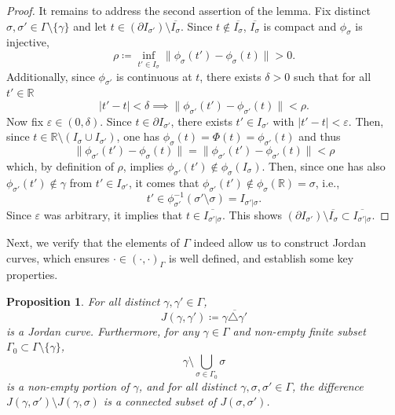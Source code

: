 \documentclass[a4paper, 11pt]{article} %
\theoremstyle{plain}
\newtheorem{proposition}[theorem]{Proposition}
\newcommand{\R}{\mathbb{R}}
\newcommand{\1}{\mathds 1}
\numberwithin{equation}{section}
\begin{document}
\begin{proof}
    It remains to address the second assertion of the lemma. Fix distinct $\sigma,\sigma'\in\Gamma\setminus\{\gamma\}$ and let $t\in(\partial I_{\sigma'})\setminus\overline{I_{\sigma}}$. Since $t\notin \overline{I_\sigma}$, $\overline{I_\sigma}$ is compact and $\phi_\sigma$ is injective,
        \[\rho\coloneqq\inf_{t'\in I_\sigma}\|\phi_\sigma(t')-\phi_\sigma(t)\|>0.\]
    Additionally, since $\phi_{\sigma'}$ is continuous at $t$, there exists $\delta>0$ such that for all $t'\in\R$
        \[|t'-t|<\delta\implies\|\phi_{\sigma'}(t')-\phi_{\sigma'}(t)\|<\rho.\]
    Now fix $\varepsilon\in(0,\delta)$. Since $t\in\partial I_{\sigma'}$, there exists $t'\in I_{\sigma'}$ with $|t'-t|<\varepsilon$. Then, since $t\in\R\setminus(I_\sigma\cup I_{\sigma'})$, one has $\phi_\sigma(t)=\Phi(t)=\phi_{\sigma'}(t)$ and thus
        \[\|\phi_{\sigma'}(t')-\phi_{\sigma}(t)\|=\|\phi_{\sigma'}(t')-\phi_{\sigma'}(t)\|<\rho\]
    which, by definition of $\rho$, implies $\phi_{\sigma'}(t')\notin\phi_\sigma(I_\sigma)$. Then, since one has also $\phi_{\sigma'}(t')\notin\gamma$ from $t'\in I_{\sigma'}$, it comes that $\phi_{\sigma'}(t')\notin\phi_\sigma(\R)=\sigma$, i.e.,
        \[t'\in\phi_{\sigma'}^{-1}(\sigma'\setminus\sigma)=I_{\sigma'|\sigma}.\]
    Since $\varepsilon$ was arbitrary, it implies that $t\in\overline{I_{\sigma'|\sigma}}$. This shows $(\partial I_{\sigma'})\setminus\overline{I_{\sigma}}\subset \overline{I_{\sigma'|\sigma}}$.
\end{proof}


Next, we verify that the elements of $\Gamma$ indeed allow us to construct Jordan curves, which ensures $\cdot\in(\cdot,\cdot)_\Gamma$ is well defined, and establish some key properties.


\begin{proposition}
    \label{prop_arc_diff}
    For all distinct $\gamma,\gamma'\in\Gamma$,
        \[J(\gamma,\gamma')\coloneqq\overline{\gamma\triangle\gamma'}\]
    is a Jordan curve. Furthermore, for any $\gamma\in\Gamma$ and non-empty finite subset $\Gamma_0\subset\Gamma\setminus\{\gamma\}$,
        \[\gamma\setminus\bigcup_{\sigma\in\Gamma_0}\sigma\]
    is a non-empty portion of $\gamma$, and for all distinct $\gamma,\sigma,\sigma'\in\Gamma$, the difference $J(\gamma,\sigma')\setminus J(\gamma,\sigma)$ is a connected subset of $J(\sigma,\sigma')$.
\end{proposition}
\end{document}

